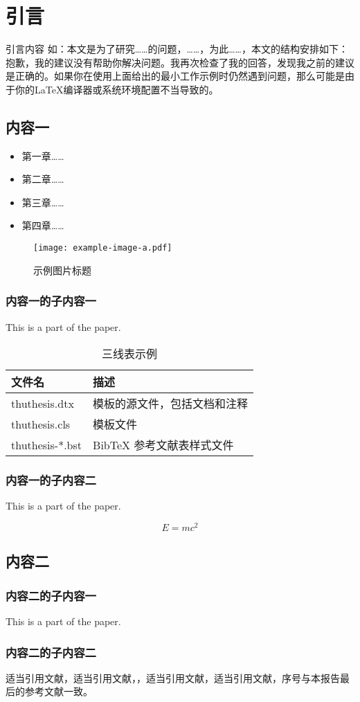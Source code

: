 \chapter{引言}
  引言内容 如：本文是为了研究……的问题，……，为此……，本文的结构安排如下：
  抱歉，我的建议没有帮助你解决问题。我再次检查了我的回答，发现我之前的建议是正确的。如果你在使用上面给出的最小工作示例时仍然遇到问题，那么可能是由于你的LaTeX编译器或系统环境配置不当导致的。
  \section{内容一}
  \begin{itemize}
    \item 第一章……
    \item 第二章……
    \item 第三章……
    \item 第四章……
  \end{itemize}

  \begin{figure}
    \centering
    \texttt{[image: example-image-a.pdf]}
    \caption{示例图片标题}
    \label{fig:example}
  \end{figure}


  \subsection{内容一的子内容一}
  This is a part of the paper.

    \begin{table}
    \centering
    \caption{三线表示例}
    \begin{tabular}{ll}
      \toprule
      文件名          & 描述                         \\
      \midrule
      thuthesis.dtx   & 模板的源文件，包括文档和注释 \\
      thuthesis.cls   & 模板文件                     \\
      thuthesis-*.bst & BibTeX 参考文献表样式文件    \\
      \bottomrule
    \end{tabular}
    \label{tab:three-line}
  \end{table}
  \clearpage
  \subsection{内容一的子内容二}
  This is a part of the paper.

  \begin{equation}
    E=mc^2
    \label{eq:example}
  \end{equation}

  \section{内容二}
  \subsection{内容二的子内容一}
  This is a part of the paper.
  \subsection{内容二的子内容二}
  适当引用文献\cite{rengongzhinengjianshi}，适当引用文献\cite{zhongguozhexueshi}，，适当引用文献\cite{jiqixuexi}，适当引用文献\cite{vaswani_attention_2017}，序号与本报告最后的参考文献一致。
